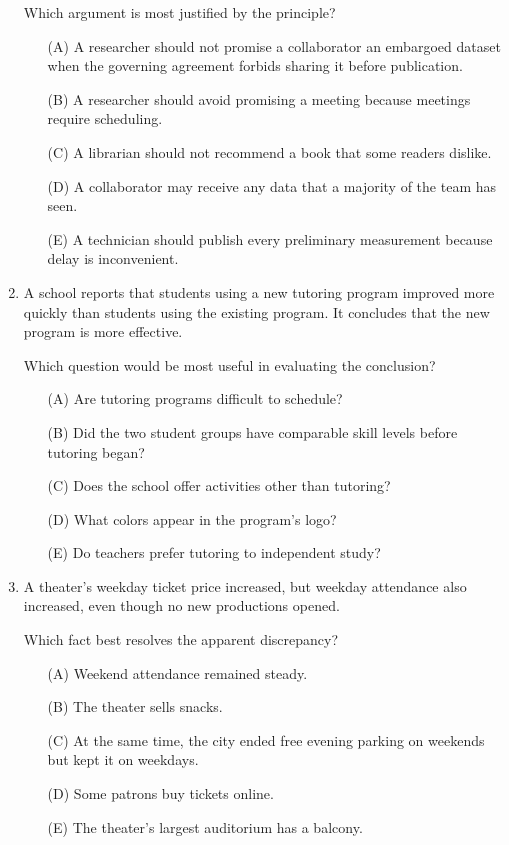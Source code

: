\begin{enumerate}
Which argument is most justified by the principle?
\begin{enumerate}
\item[(A)] A researcher should not promise a collaborator an embargoed dataset when the governing agreement forbids sharing it before publication.
\item[(B)] A researcher should avoid promising a meeting because meetings require scheduling.
\item[(C)] A librarian should not recommend a book that some readers dislike.
\item[(D)] A collaborator may receive any data that a majority of the team has seen.
\item[(E)] A technician should publish every preliminary measurement because delay is inconvenient.
\end{enumerate}

\item A school reports that students using a new tutoring program improved more quickly than students using the existing program. It concludes that the new program is more effective.

Which question would be most useful in evaluating the conclusion?
\begin{enumerate}
\item[(A)] Are tutoring programs difficult to schedule?
\item[(B)] Did the two student groups have comparable skill levels before tutoring began?
\item[(C)] Does the school offer activities other than tutoring?
\item[(D)] What colors appear in the program's logo?
\item[(E)] Do teachers prefer tutoring to independent study?
\end{enumerate}

\item A theater's weekday ticket price increased, but weekday attendance also increased, even though no new productions opened.

Which fact best resolves the apparent discrepancy?
\begin{enumerate}
\item[(A)] Weekend attendance remained steady.
\item[(B)] The theater sells snacks.
\item[(C)] At the same time, the city ended free evening parking on weekends but kept it on weekdays.
\item[(D)] Some patrons buy tickets online.
\item[(E)] The theater's largest auditorium has a balcony.
\end{enumerate}


\end{enumerate}
